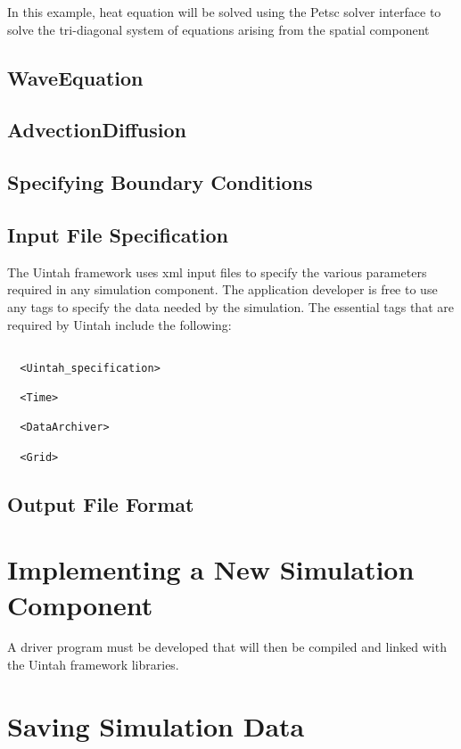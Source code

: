 \documentclass[11pt,fleqn]{book} %
\begin{document}
In this example, heat equation will be solved using the Petsc solver
interface to solve the tri-diagonal system of equations arising from
the spatial component

\section{WaveEquation}

\section{AdvectionDiffusion}

\section{Specifying Boundary Conditions}

\section{Input File Specification}

The Uintah framework uses xml input files to specify the various
parameters required in any simulation component.  The application
developer is free to use any tags to specify the data needed by the
simulation.  The essential tags that are required by Uintah include
the following:

\begin{lstlisting}

  <Uintah_specification>

  <Time>

  <DataArchiver>

  <Grid>

\end{lstlisting}

\section{Output File Format}



\chapter{Implementing a New Simulation Component}

A driver program must be developed that will then be compiled and
linked with the Uintah framework libraries.

\chapter{Saving Simulation Data}
\end{document}

